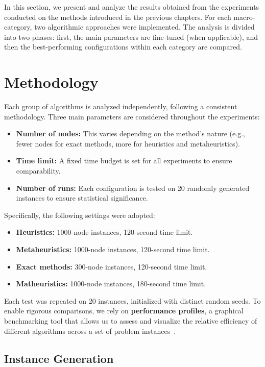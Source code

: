 In this section, we present and analyze the results obtained from the experiments conducted on the methods introduced in the previous chapters. For each macro-category, two algorithmic approaches were implemented. The analysis is divided into two phases: first, the main parameters are fine-tuned (when applicable), and then the best-performing configurations within each category are compared.

\section{Methodology}

Each group of algorithms is analyzed independently, following a consistent methodology. Three main parameters are considered throughout the experiments:
\begin{itemize}
    \item \textbf{Number of nodes:} This varies depending on the method's nature (e.g., fewer nodes for exact methods, more for heuristics and metaheuristics).
    \item \textbf{Time limit:} A fixed time budget is set for all experiments to ensure comparability.
    \item \textbf{Number of runs:} Each configuration is tested on 20 randomly generated instances to ensure statistical significance.
\end{itemize}

Specifically, the following settings were adopted:
\begin{itemize}
    \item \textbf{Heuristics:} 1000-node instances, 120-second time limit.
    \item \textbf{Metaheuristics:} 1000-node instances, 120-second time limit.
    \item \textbf{Exact methods:} 300-node instances, 120-second time limit.
    \item \textbf{Matheuristics:} 1000-node instances, 180-second time limit.
\end{itemize}

Each test was repeated on 20 instances, initialized with distinct random seeds. To enable rigorous comparisons, we rely on \textbf{performance profiles}, a graphical benchmarking tool that allows us to assess and visualize the relative efficiency of different algorithms across a set of problem instances~\cite{dolan2002performance}.

\subsection{Instance Generation}

